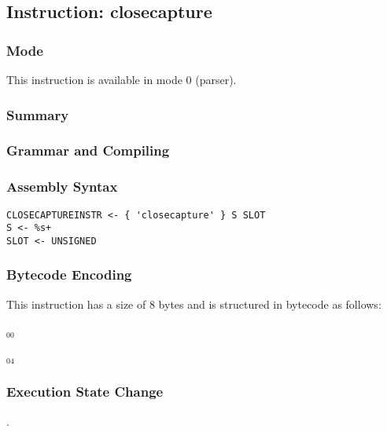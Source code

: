 \subsection{Instruction: closecapture}

\subsubsection{Mode}
This instruction is available in mode 0 (parser).
\subsubsection{Summary}


\subsubsection{Grammar and Compiling}


\subsubsection{Assembly Syntax}

\begin{myquote}
\begin{verbatim}
CLOSECAPTUREINSTR <- { 'closecapture' } S SLOT
S <- %s+
SLOT <- UNSIGNED
\end{verbatim}
\end{myquote}

\subsubsection{Bytecode Encoding}

This instruction has a size of 8 bytes and is structured in bytecode as follows:

$_{00}$\ 



$_{04}$\ 

\subsubsection{Execution State Change}

.



